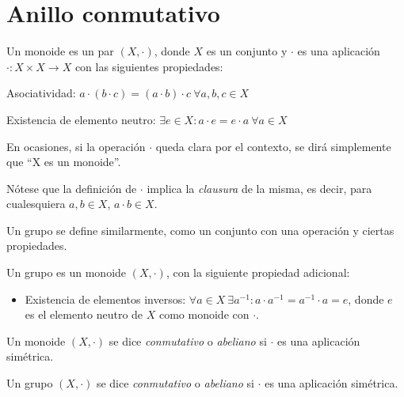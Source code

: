 \section{Anillo conmutativo}

\begin{ndef}[Monoide]
  Un monoide es un par $(X, \cdot)$, donde $X$ es un conjunto y $\cdot$ es una aplicación $\cdot: X\times X\to X$ con las siguientes propiedades:
  \begin{nlist}
  \item Asociatividad: $a\cdot (b \cdot c) = (a \cdot b) \cdot c \ \forall a,b,c \in X$
  \item Existencia de elemento neutro: $\exists e \in X : a \cdot e = e \cdot a \ \forall a \in X$
  \end{nlist}

  En ocasiones, si la operación $\cdot$ queda clara por el contexto, se dirá simplemente que ``X es un monoide''.
\end{ndef}

Nótese que la definición de $\cdot$ implica la \emph{clausura} de la misma, es decir, para cualesquiera $a,b \in X$, $a\cdot b \in X$.

Un grupo se define similarmente, como un conjunto con una operación y ciertas propiedades.

\begin{ndef}[Grupo]
  Un grupo es un monoide $(X, \cdot)$, con la siguiente propiedad adicional:

  \begin{itemize}
  \item Existencia de elementos inversos: $\forall a\in X \ \exists a^{-1} : a\cdot a^{-1} = a^{-1}\cdot a = e$, donde $e$ es el elemento neutro de $X$ como monoide con $\cdot$.
  \end{itemize}

\end{ndef}

\begin{ndef}
  Un monoide $(X, \cdot)$ se dice \emph{conmutativo} o \emph{abeliano} si $\cdot$ es una aplicación simétrica.
\end{ndef}

\begin{ndef}
  Un grupo $(X, \cdot)$ se dice \emph{conmutativo} o \emph{abeliano} si $\cdot$ es una aplicación simétrica.
\end{ndef}


